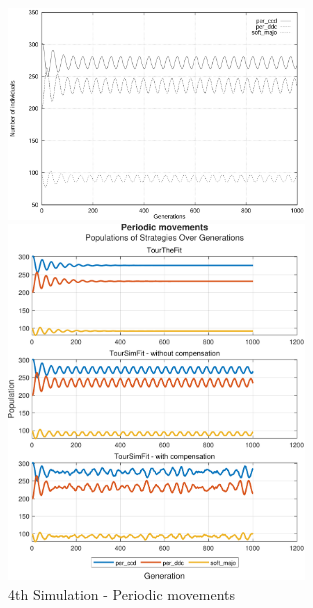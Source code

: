 \documentclass[12pt]{article}
\begin{document}
	\begin{figure}[h]
	    \centering
		\includegraphics[width=0.7\textwidth]{RefPaperFigures/fig4.jpeg}\par\vspace{0.5em}
	    \includegraphics[width=0.7\textwidth]{Periodic movements.pdf}
	    \caption{4th Simulation - Periodic movements}
	    \label{fig:Periodic movements}
	\end{figure}
\end{document}
